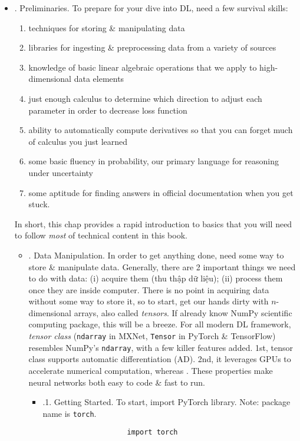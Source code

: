 \documentclass{article}
\begin{document}
\begin{enumerate}
\begin{itemize}
		\item {. Preliminaries.} To prepare for your dive into DL, need a few survival skills:
		\begin{enumerate}
			\item techniques for storing \& manipulating data
			\item libraries for ingesting \& preprocessing data from a variety of sources
			\item knowledge of basic linear algebraic operations that we apply to high-dimensional data elements
			\item just enough calculus to determine which direction to adjust each parameter in order to decrease loss function
			\item ability to automatically compute derivatives so that you can forget much of calculus you just learned
			\item some basic fluency in probability, our primary language for reasoning under uncertainty
			\item some aptitude for finding answers in official documentation when you get stuck.
		\end{enumerate}
		In short, this chap provides a rapid introduction to basics that you will need to follow {\it most} of technical content in this book.
		\begin{itemize}
			\item {. Data Manipulation.} In order to get anything done, need some way to store \& manipulate data. Generally, there are 2 important things we need to do with data: (i) acquire them (thu thập dữ liệu); (ii) process them once they are inside computer. There is no point in acquiring data without some way to store it, so to start, get our hands dirty with $n$-dimensional arrays, also called {\it tensors}. If already know NumPy scientific computing package, this will be a breeze. For all modern DL framework, {\it tensor class} ({\tt ndarray} in MXNet, {\tt Tensor} in PyTorch \& TensorFlow) resembles NumPy's {\tt ndarray}, with a few killer features added. 1st, tensor class supports automatic differentiation (AD). 2nd, it leverages GPUs to accelerate numerical computation, whereas . These properties make neural networks both easy to code \& fast to run.
			\begin{itemize}
				\item {.1. Getting Started.} To start, import PyTorch library. Note: package name is {\tt torch}.
				\begin{verbatim}
					import torch

\end{verbatim}
\end{itemize}
\end{itemize}
\end{itemize}
\end{enumerate}
\end{document}
